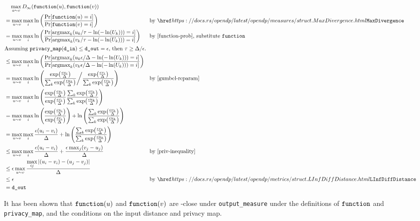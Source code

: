\documentclass{article}
\begin{document}
\begin{align*}
    &\quad \max\limits_{u \sim v} D_\infty(\function(u), \function(v)) \\
    &= \max\limits_{u \sim v} \max\limits_{i} \ln\left(\frac{\Pr[\function(u) = i]}{\Pr[\function(v) = i]}\right) 
    &&\text{by } \rustdoc{measures/struct}{MaxDivergence}\\
    &= \max\limits_{u \sim v} \max\limits_{i} \ln\left(\frac
            {\Pr[\mathrm{argmax}_k (u_k / \tau - \ln(-\ln(U_k))) = i]}
            {\Pr[\mathrm{argmax}_k (v_k / \tau - \ln(-\ln(U_k))) = i]}
        \right) &&\text{by \ref{function-prob}, substitute \function}\\
    \intertext{Assuming $\texttt{privacy\_map}(\din) \le \dout = \epsilon$, then $ \tau \geq \Delta / \epsilon$.}
    &\le \max\limits_{u \sim v} \max\limits_{i} \ln\left(\frac
            {\Pr[\mathrm{argmax}_k (u_k \epsilon / \Delta - \ln(-\ln(U_k))) = i]}
            {\Pr[\mathrm{argmax}_k (v_k \epsilon / \Delta - \ln(-\ln(U_k))) = i]}
        \right)\\
    &= \max\limits_{u \sim v} \max\limits_{i} \ln \left(
        \frac
            {\exp(\frac{\epsilon u_i}{\Delta})}
            {\sum_{k} \exp(\frac{\epsilon u_k}{\Delta})
        }
        \bigg/ \frac
            {\exp(\frac{\epsilon v_i}{\Delta})}
            {\sum_{k} \exp(\frac{\epsilon v_k}{\Delta})} \right)
        &&\text{by \ref{gumbel-reparam}} \\
    &= \max\limits_{u \sim v} \max\limits_{i} \ln \left(\frac
        {\exp(\frac{\epsilon u_i}{\Delta})}{\exp(\frac{\epsilon v_i}{\Delta})}
        \frac{\sum_{k} \exp(\frac{\epsilon v_k}{\Delta})}{\sum_{k} \exp(\frac{\epsilon u_k}{\Delta})}\right) \\
    &= \max\limits_{u \sim v} \max\limits_{i} \ln \left(\frac
        {\exp(\frac{\epsilon u_i}{\Delta})}{\exp(\frac{\epsilon v_i}{\Delta})}\right) + \ln \left(
        \frac{\sum_{k} \exp(\frac{\epsilon v_k}{\Delta})}{\sum_{k} \exp(\frac{\epsilon u_k}{\Delta})}\right) \\
    &= \max\limits_{u \sim v} \max\limits_{i} \frac{\epsilon (u_i - v_i)}{\Delta} 
        + \ln\left(\frac{\sum_{k} \exp(\frac{\epsilon v_k}{\Delta})}{\sum_{k} \exp(\frac{\epsilon u_k}{\Delta})}\right) \\
    &\leq \max\limits_{u \sim v} \max\limits_{i} \frac{\epsilon (u_i - v_i)}{\Delta} + \frac{\epsilon \max_j (v_j - u_j)}{\Delta} &&\text{by \ref{priv-inequality}} \\
    &\leq \epsilon \max\limits_{u \sim v} \frac{\max\limits_{ij} \abs{(u_i - v_i) - (u_j - v_j)}}{\Delta} \\
    &\leq \epsilon &&\text{by }\rustdoc{metrics/struct}{LInfDiffDistance} \\
    &= \dout
\end{align*}    

It has been shown that $\texttt{function}(u)$ and $\texttt{function}(v)$ are \dout-close under \texttt{output\_measure} 
under the definitions of $\texttt{function}$ and \texttt{privacy\_map}, 
and the conditions on the input distance and privacy map.





\end{document}
